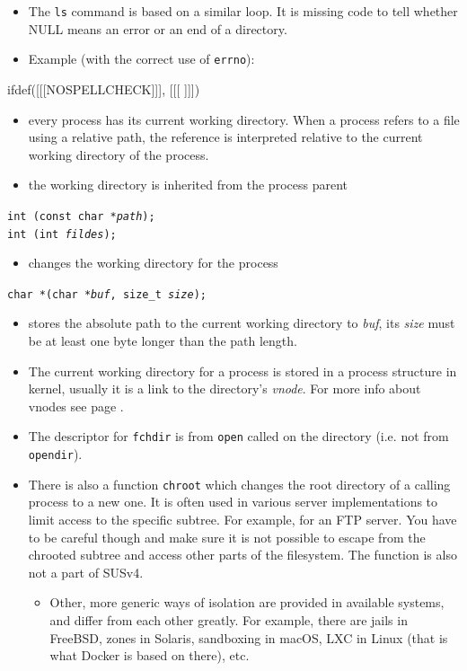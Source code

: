 \begin{itemize}
\item The \texttt{ls} command is based on a similar loop.  It is missing code to
tell whether NULL means an error or an end of a directory.
\item Example (with the correct use of \texttt{errno}):
\end{itemize}


ifdef([[[NOSPELLCHECK]]], [[[
]]])

\begin{slide}
\begin{itemize}
\item every process has its current working directory.  When a process refers to
a file using a relative path, the reference is interpreted relative to the
current working directory of the process.
\item the working directory is inherited from the process parent
\end{itemize}
\texttt{int (const char *\emph{path});}\\
\texttt{int (int \emph{fildes});}
\begin{itemize}
\item changes the working directory for the process
\end{itemize}
\texttt{char *(char *\emph{buf}, size\_t \emph{size});}
\begin{itemize}
\item stores the absolute path to the current working directory to \emph{buf},
its \emph{size} must be at least one byte longer than the path length.
\end{itemize}
\end{slide}

\begin{itemize}
\item The current working directory for a process is stored in a process
structure in kernel, usually it is a link to the directory's \emph{vnode}.
For more info about vnodes see page \pageref{VFS}.
\item The descriptor for \texttt{fchdir} is from \texttt{open} called on the
directory (i.e. not from \texttt{opendir}).
\item There is also a function \texttt{chroot} which changes the root
directory of a calling process to a new one.  It is often used in various server
implementations to limit access to the specific subtree.  For example, for an
FTP server.  You have to be careful though and make sure it is not possible to
escape from the chrooted subtree and access other parts of the filesystem.  The
function is also not a part of SUSv4.
\begin{itemize}
\item Other, more generic ways of isolation are provided in available systems,
and differ from each other greatly.  For example, there are jails in Free\-BSD,
zones in Solaris, sandboxing in macOS, LXC in Linux (that is what Docker is
based on there), etc.
\end{itemize}
\end{itemize}

